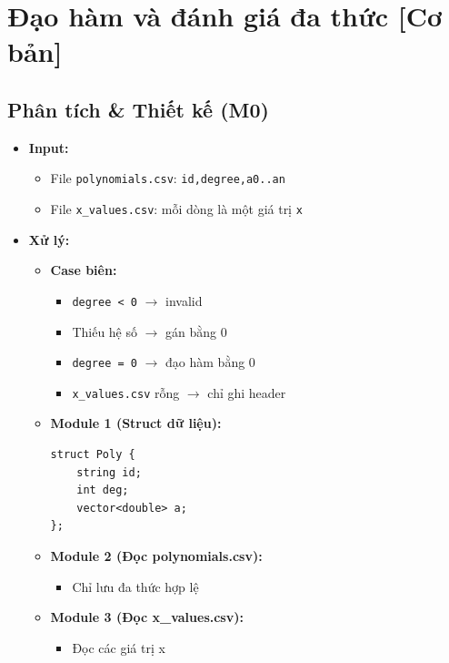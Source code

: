 \section{Đạo hàm và đánh giá đa thức [Cơ bản]}
\subsection{Phân tích \& Thiết kế (M0)}
\begin{itemize}
    \item \textbf{Input:}
    \begin{itemize}
        \item File \texttt{polynomials.csv}: \texttt{id,degree,a0..an}
        \item File \texttt{x\_values.csv}: mỗi dòng là một giá trị \texttt{x}
    \end{itemize}

    \item \textbf{Xử lý:}
    \begin{itemize}
        \item \textbf{Case biên:}
        \begin{itemize}
            \item \texttt{degree < 0} $\rightarrow$ invalid
            \item Thiếu hệ số $\rightarrow$ gán bằng 0
            \item \texttt{degree = 0} $\rightarrow$ đạo hàm bằng 0
            \item \texttt{x\_values.csv} rỗng $\rightarrow$ chỉ ghi header
        \end{itemize}

        \item \textbf{Module 1 (Struct dữ liệu):}
\begin{lstlisting}
struct Poly {
    string id;
    int deg;
    vector<double> a;
};
\end{lstlisting}

        \item \textbf{Module 2 (Đọc polynomials.csv):}
        \begin{itemize}
            \item Chỉ lưu đa thức hợp lệ
        \end{itemize}

        \item \textbf{Module 3 (Đọc x\_values.csv):}
        \begin{itemize}
            \item Đọc các giá trị x
        \end{itemize}


\end{itemize}
\end{itemize}

